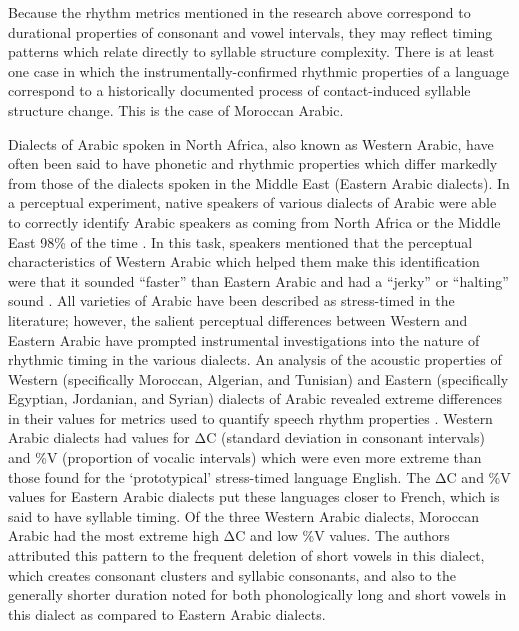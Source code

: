   Because the rhythm metrics mentioned in the research above correspond to durational properties of consonant and vowel intervals, they may reflect timing patterns which relate directly to syllable structure complexity. There is at least one case in which the instrumentally-confirmed rhythmic properties of a language correspond to a historically documented process of contact-induced syllable structure change. This is the case of Moroccan Arabic.

  Dialects of Arabic spoken in North Africa, also known as Western Arabic, have often been said to have phonetic and rhythmic properties which differ markedly from those of the dialects spoken in the Middle East (Eastern Arabic dialects). In a perceptual experiment, native speakers of various dialects of Arabic were able to correctly identify Arabic speakers as coming from North Africa or the Middle East 98\% of the time \citep{BarkatEtAl1999}. In this task, speakers mentioned that the perceptual characteristics of Western Arabic which helped them make this identification were that it sounded “faster” than Eastern Arabic and had a “jerky” or “halting” sound \citep{GhazaliEtAl2002}. All varieties of Arabic have been described as stress-timed in the literature; however, the salient perceptual differences between Western and Eastern Arabic have prompted instrumental investigations into the nature of rhythmic timing in the various dialects. An analysis of the acoustic properties of Western (specifically Moroccan, Algerian, and Tunisian) and Eastern (specifically Egyptian, Jordanian, and Syrian) dialects of Arabic revealed extreme differences in their values for metrics used to quantify speech rhythm properties \citep{HamdiEtAl2004}. Western Arabic dialects had values for ΔC (standard deviation in consonant intervals) and \%V (proportion of vocalic intervals) which were even more extreme than those found for the ‘prototypical’ stress-timed language English. The ΔC and \%V values for Eastern Arabic dialects put these languages closer to French, which is said to have syllable timing. Of the three Western Arabic dialects, Moroccan Arabic had the most extreme high ΔC and low \%V values. The authors attributed this pattern to the frequent deletion of short vowels in this dialect, which creates consonant clusters and syllabic consonants, and also to the generally shorter duration noted for both phonologically long and short vowels in this dialect as compared to Eastern Arabic dialects.

